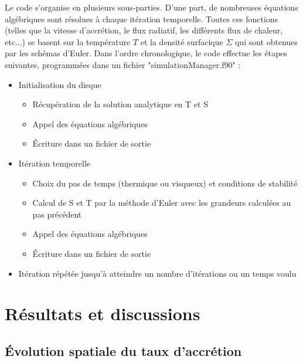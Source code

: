 \documentclass[a4paper,12pt]{article}
\begin{document}
Le code s'organise en plusieurs sous-parties. D'une part, de nombreuses équations algébriques sont résolues à chaque itération temporelle. Toutes ces fonctions (telles que la vitesse d'accrétion, le flux radiatif, les différents flux de chaleur, etc...) se basent sur la température $T$ et la densité surfacique $\Sigma$ qui sont obtenues par les schémas d'Euler. Dans l'ordre chronologique, le code effectue les étapes suivantes, programmées dans un fichier "simulationManager.f90" :
\begin{itemize}
	\item{Initialisation du disque}
	\begin{itemize}
		\item{Récupération de la solution analytique en T et S}
		\item{Appel des équations algébriques}
		\item{Écriture dans un fichier de sortie}
	\end{itemize}
	\item{Itération temporelle}
	\begin{itemize}
		\item{Choix du pas de temps (thermique ou visqueux) et conditions de stabilité}
		\item{Calcul de S et T par la méthode d'Euler avec les grandeurs calculées au pas précédent}
		\item{Appel des équations algébriques}
		\item{Écriture dans un fichier de sortie}
	\end{itemize}
	\item{Itération répétée jusqu'à atteindre un nombre d'itérations ou un temps voulu}
\end{itemize}

\section{Résultats et discussions}

\subsection{Évolution spatiale du taux d'accrétion}
\end{document}
